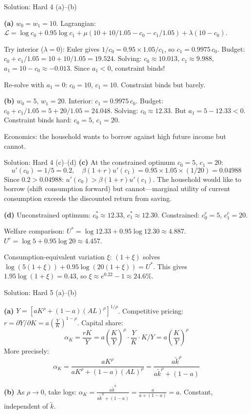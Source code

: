 \documentclass[aspectratio=169,10pt]{beamer}
\newcommand{\backbutton}[1]{\hfill\hyperlink{#1}{\beamerbutton{Back}}}
\begin{document}
\begin{frame}{Solution: Hard 4 (a)--(b)}
\hypertarget{s-h4}{}

\textbf{(a)} $w_0=w_1=10$. Lagrangian: $\mathcal{L} = \log c_0 + 0.95\log c_1 + \mu(10+10/1.05-c_0-c_1/1.05) + \lambda(10-c_0)$.

Try interior ($\lambda=0$): Euler gives $1/c_0 = 0.95\times 1.05/c_1$, so $c_1 = 0.9975\,c_0$. Budget: $c_0 + c_1/1.05 = 10+10/1.05 = 19.524$. Solving: $c_0 \approx 10.013$, $c_1 \approx 9.988$, $a_1 = 10-c_0 \approx -0.013$. Since $a_1 < 0$, constraint binds!

Re-solve with $a_1=0$: $c_0=10$, $c_1=10$. Constraint binds but barely.

\medskip
\textbf{(b)} $w_0=5$, $w_1=20$. Interior: $c_1=0.9975\,c_0$. Budget: $c_0+c_1/1.05 = 5+20/1.05=24.048$. Solving: $c_0\approx 12.33$. But $a_1 = 5-12.33<0$. Constraint binds hard: $c_0=5$, $c_1=20$.

Economics: the household wants to borrow against high future income but cannot.
\end{frame}

\begin{frame}{Solution: Hard 4 (c)--(d)}
\textbf{(c)} At the constrained optimum $c_0=5$, $c_1=20$:
\[
u'(c_0) = 1/5 = 0.2, \quad \beta(1+r)u'(c_1) = 0.95\times 1.05\times(1/20) = 0.04988
\]
Since $0.2 > 0.04988$: $u'(c_0) > \beta(1+r)u'(c_1)$. The household would like to borrow (shift consumption forward) but cannot---marginal utility of current consumption exceeds the discounted return from saving.

\medskip
\textbf{(d)} Unconstrained optimum: $c_0^*\approx 12.33$, $c_1^*\approx 12.30$. Constrained: $c_0^c=5$, $c_1^c=20$.

Welfare comparison: $U^* = \log 12.33 + 0.95\log 12.30 \approx 4.887$. $U^c = \log 5 + 0.95\log 20 \approx 4.457$.

Consumption-equivalent variation $\xi$: $(1+\xi)$ solves $\log(5(1+\xi))+0.95\log(20(1+\xi)) = U^*$. This gives $1.95\log(1+\xi) = 0.43$, so $\xi \approx e^{0.22}-1 \approx 24.6\%$.
\backbutton{q-h4}
\end{frame}

\begin{frame}{Solution: Hard 5 (a)--(b)}
\hypertarget{s-h5}{}

\textbf{(a)} $Y = [aK^\rho + (1-a)(AL)^\rho]^{1/\rho}$. Competitive pricing: $r = \partial Y/\partial K = a\left(\frac{Y}{K}\right)^{1-\rho}$. Capital share:
\[
\alpha_K = \frac{rK}{Y} = a\left(\frac{K}{Y}\right)^{\rho} \cdot \frac{Y}{K}\cdot K/Y = a\left(\frac{K}{Y}\right)^{\rho}
\]
More precisely:
\[
\alpha_K = \frac{a K^\rho}{aK^\rho + (1-a)(AL)^\rho} = \frac{a\tilde{k}^\rho}{a\tilde{k}^\rho + (1-a)}
\]

\textbf{(b)} As $\rho\to 0$, take logs: $\alpha_K = \frac{a\tilde{k}^0}{a\tilde{k}^0+(1-a)} = \frac{a}{a+(1-a)} = a$. Constant, independent of $\tilde{k}$.
\end{frame}
\end{document}
